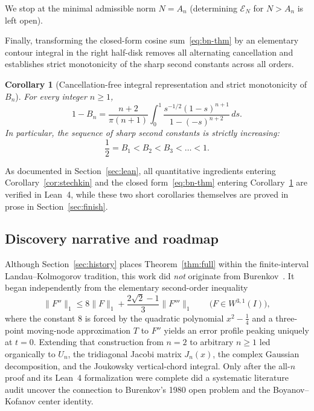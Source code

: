 \documentclass[11pt,a4paper]{article}
\newcommand{\Lone}[1]{\lVert #1\rVert_1}
\newtheorem{corollary}[theorem]{Corollary}
\theoremstyle{remark}
\numberwithin{equation}{section}
\begin{document}
We stop at the minimal admissible norm $N = A_n$ (determining $\mathcal{E}_N$ for $N > A_n$ is left open).

Finally, transforming the closed-form cosine sum~\eqref{eq:bn-thm} by an elementary contour integral in the right half-disk removes all alternating cancellation and establishes strict monotonicity of the sharp second constants across all orders.

\begin{corollary}[Cancellation-free integral representation and strict monotonicity of $B_n$]
    \label{cor:Bn-strict-mono}
    For every integer $n \ge 1$,
    \begin{equation}
        1 - B_n = \frac{n + 2}{\pi(n + 1)}\int_0^1 \frac{s^{-1/2}(1 - s)^{n+1}}{1 - (-s)^{n+2}}\,ds.
        \label{eq:Bn-integral}
    \end{equation}
    In particular, the sequence of sharp second constants is strictly increasing:
    \[
        \frac12 = B_1 < B_2 < B_3 < \dots < 1.
    \]
\end{corollary}

As documented in Section~\ref{sec:lean}, all quantitative ingredients entering Corollary~\ref{cor:stechkin} and the closed form~\eqref{eq:bn-thm} entering Corollary~\ref{cor:Bn-strict-mono} are verified in Lean~4, while these two short corollaries themselves are proved in prose in Section~\ref{sec:finish}.

\subsection{Discovery narrative and roadmap}
\label{sec:roadmap}

Although Section~\ref{sec:history} places Theorem~\ref{thm:full} within the finite-interval Landau--Kolmogorov tradition, this work did \emph{not} originate from Burenkov~\cite{Burenkov1980}. It began independently from the elementary second-order inequality
\begin{equation}
    \Lone{F''} \le 8\Lone{F} + \frac{2\sqrt{2} - 1}{3}\Lone{F'''}
    \qquad \bigl(F \in W^{3,1}(I)\bigr),
    \label{eq:n2}
\end{equation}
where the constant $8$ is forced by the quadratic polynomial $x^2 - \frac14$ and a three-point moving-node approximation $T$ to $F''$ yields an error profile peaking uniquely at $t = 0$. Extending that construction from $n = 2$ to arbitrary $n \ge 1$ led organically to $U_n$, the tridiagonal Jacobi matrix $J_n(x)$, the complex Gaussian decomposition, and the Joukowsky vertical-chord integral. Only after the all-$n$ proof and its Lean~4 formalization were complete did a systematic literature audit uncover the connection to Burenkov's 1980 open problem and the Boyanov--Kofanov center identity.
\end{document}
